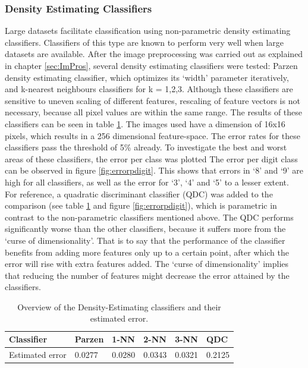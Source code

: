 \subsubsection*{Density Estimating Classifiers}
Large datasets facilitate classification using non-parametric density estimating classifiers. Classifiers of this type are known to perform very well when large datasets are available. After the image preprocessing was carried out as explained in chapter \ref{sec:ImPros}, several density estimating classifiers were tested: Parzen density estimating classifier, which optimizes its ‘width’ parameter iteratively, and k-nearest neighbours classifiers for k = 1,2,3. Although these classifiers are sensitive to uneven scaling of different features, rescaling of feature vectors is not necessary, because all pixel values are within the same range. The results of these classifiers can be seen in table \ref{tab:density}. The images used have a dimension of 16x16 pixels, which results in a 256 dimensional feature-space. The error rates for these classifiers pass the threshold of 5\% already. To investigate the best and worst areas of these classifiers, the error per class was plotted The error per digit class can be observed in figure \ref{fig:errorpdigit}. This shows that errors in ‘8’ and ‘9’ are high for all classifiers, as well as the error for ‘3’, ‘4’ and ‘5’ to a lesser extent. \\
For reference, a quadratic discriminant classifier (QDC) was added to the comparison (see table \ref{tab:density} and figure \ref{fig:errorpdigit}), which is parametric in contrast to the non-parametric classifiers mentioned above. The QDC performs significantly worse than the other classifiers, because it suffers more from the ‘curse of dimensionality’. That is to say that the performance of the classifier benefits from adding more features only up to a certain point, after which the error will rise with extra features added. The ‘curse of dimensionality’ implies that reducing the number of features might decrease the error attained by the classifiers.
\begin{table}[H]
	\centering
	\caption{Overview of the Density-Estimating classifiers and their estimated error.}
	\label{tab:density}
	\begin{tabular}{l|lllll}
		Classifier      & Parzen & 1-NN   & 2-NN   & 3-NN   & QDC    \\ \hline
		Estimated error & 0.0277 & 0.0280 & 0.0343 & 0.0321 & 0.2125
	\end{tabular}
\end{table}
